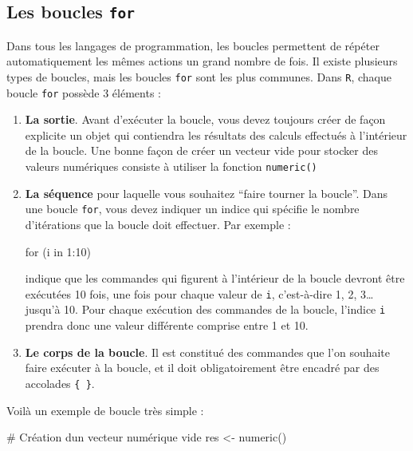 \documentclass[
  french,
  a4paper,
  DIV=11,
  numbers=noendperiod,
  oneside]{scrreprt}
\newenvironment{Shaded}{}{}
\newcommand{\CommentTok}[1]{\textcolor[rgb]{0.42,0.45,0.49}{#1}}
\newcommand{\ControlFlowTok}[1]{\textcolor[rgb]{0.84,0.23,0.29}{#1}}
\newcommand{\DecValTok}[1]{\textcolor[rgb]{0.00,0.36,0.77}{#1}}
\newcommand{\FunctionTok}[1]{\textcolor[rgb]{0.44,0.26,0.76}{#1}}
\newcommand{\NormalTok}[1]{\textcolor[rgb]{0.14,0.16,0.18}{#1}}
\newcommand{\OtherTok}[1]{\textcolor[rgb]{0.44,0.26,0.76}{#1}}
\newcommand{\SpecialCharTok}[1]{\textcolor[rgb]{0.00,0.36,0.77}{#1}}
\begin{document}
\begin{tcolorbox}
\section{\texorpdfstring{Les boucles
\texttt{for}}{Les boucles for}}\label{sec-for}

Dans tous les langages de programmation, les boucles permettent de
répéter automatiquement les mêmes actions un grand nombre de fois. Il
existe plusieurs types de boucles, mais les boucles \texttt{for} sont
les plus communes. Dans \texttt{R}, chaque boucle \texttt{for} possède 3
éléments :

\begin{enumerate}
\def\labelenumi{\arabic{enumi}.}
\item
  \textbf{La sortie}. Avant d'exécuter la boucle, vous devez toujours
  créer de façon explicite un objet qui contiendra les résultats des
  calculs effectués à l'intérieur de la boucle. Une bonne façon de créer
  un vecteur vide pour stocker des valeurs numériques consiste à
  utiliser la fonction \texttt{numeric()}
\item
  \textbf{La séquence} pour laquelle vous souhaitez ``faire tourner la
  boucle''. Dans une boucle \texttt{for}, vous devez indiquer un indice
  qui spécifie le nombre d'itérations que la boucle doit effectuer. Par
  exemple :

\begin{Shaded}
\begin{Highlighting}[]
\ControlFlowTok{for}\NormalTok{ (i }\ControlFlowTok{in} \DecValTok{1}\SpecialCharTok{:}\DecValTok{10}\NormalTok{)}
\end{Highlighting}
\end{Shaded}

  indique que les commandes qui figurent à l'intérieur de la boucle
  devront être exécutées 10 fois, une fois pour chaque valeur de
  \texttt{i}, c'est-à-dire 1, 2, 3\ldots{} jusqu'à 10. Pour chaque
  exécution des commandes de la boucle, l'indice \texttt{i} prendra donc
  une valeur différente comprise entre 1 et 10.
\item
  \textbf{Le corps de la boucle}. Il est constitué des commandes que
  l'on souhaite faire exécuter à la boucle, et il doit obligatoirement
  être encadré par des accolades \texttt{\{\ \}}.
\end{enumerate}

Voilà un exemple de boucle très simple :

\begin{Shaded}
\begin{Highlighting}[]
\CommentTok{\# Création d\textquotesingle{}un vecteur numérique vide}
\NormalTok{res }\OtherTok{\textless{}{-}} \FunctionTok{numeric}\NormalTok{()}


\end{Highlighting}
\end{Shaded}
\end{tcolorbox}
\end{document}
